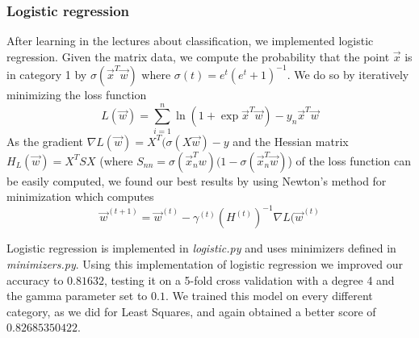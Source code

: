 \documentclass[10pt,conference,compsocconf]{IEEEtran}
\begin{document}
\subsubsection{Logistic regression} After learning in the lectures about classification, we implemented logistic regression. Given the matrix data, we compute the probability that the point $\vec{x}$ is in category 1 by $\sigma(\vec{x}^T\vec{w})$ where $\sigma(t) = e^t (e^t + 1)^{-1}$. We do so by iteratively minimizing the loss function
$$L(\vec{w}) = \sum^n_{i=1} \ln(1 + \exp{\vec{x}^T \vec{w}}) - y_n \vec{x}^T\vec{w}$$
As the gradient $\nabla L(\vec{w}) = X^T(\sigma(X\vec{w}) - y$ and the Hessian matrix $H_{L}(\vec{w}) = X^TSX$  (where $S_{nn} = \sigma(\vec{x}_n^T w)(1 - \sigma(\vec{x}_n^T\vec{w})$) of the loss function can be easily computed, we found our best results by using Newton's method for minimization which computes $$\vec{w}^{(t+1)} = \vec{w}^{(t)} - \gamma^{(t)} (H^{(t)})^{-1}\nabla L(\vec{w}^{(t)}$$

Logistic regression is implemented in \textit{logistic.py} and uses minimizers defined in \textit{minimizers.py}. Using this implementation of logistic regression we improved our accuracy to $0.81632$, testing it on a 5-fold cross validation with a degree 4 and the gamma parameter set to $0.1$. We trained this model on every different category, as we did for Least Squares, and again obtained a better score of $0.82685350422$.
\end{document}
